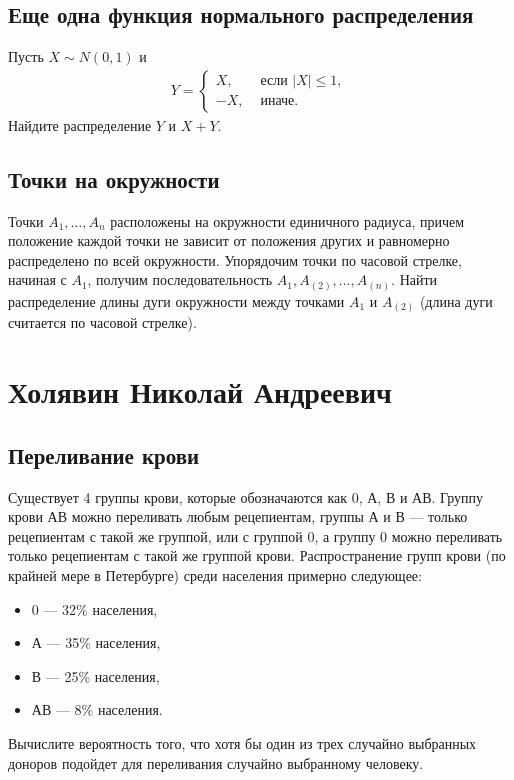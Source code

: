 \documentclass[12pt]{article}
\begin{document}
\subsection{Еще одна функция нормального распределения}
Пусть $X \sim N(0, 1)$ и 
\begin{align*}
    Y = \begin{cases}
        X, &\text{ если } |X| \le 1, \\
        -X, &\text{ иначе.}
    \end{cases}
\end{align*}
Найдите распределение $Y$ и $X + Y$.

\subsection{Точки на окружности}
Точки $A_1, \dots, A_n$ расположены на окружности единичного радиуса, причем положение каждой точки не зависит от положения других и равномерно распределено по всей окружности. Упорядочим точки по часовой стрелке, начиная с $A_1$, получим последовательность $A_1, A_{(2)}, \dots, A_{(n)}$. Найти распределение длины дуги окружности между точками $A_1$ и $A_{(2)}$ (длина дуги считается по часовой стрелке).

\newpage
\section{Холявин Николай Андреевич}

\subsection{Переливание крови}
Существует 4 группы крови, которые обозначаются как 0, А, В и АВ. Группу крови АВ можно переливать любым рецепиентам, группы А и В --- только рецепиентам с такой же группой, или с группой 0, а группу 0 можно переливать только рецепиентам с такой же группой крови. Распространение групп крови (по крайней мере в Петербурге) среди населения примерно следующее:
\begin{itemize}
    \item 0 --- 32\% населения,
    \item А --- 35\% населения,
    \item В --- 25\% населения,
    \item АВ --- 8\% населения.
\end{itemize}
Вычислите вероятность того, что хотя бы один из трех случайно выбранных доноров подойдет для переливания случайно выбранному человеку. 
\end{document}
